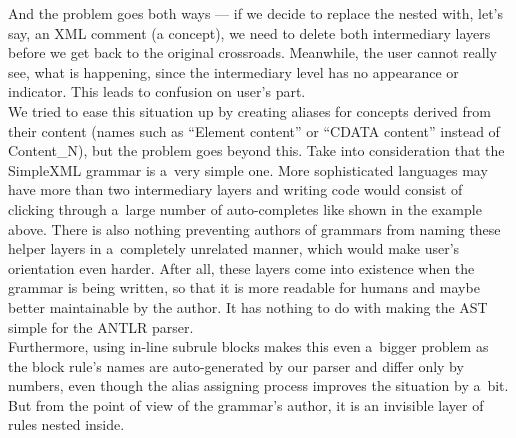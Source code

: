 And the problem goes both ways --- if we decide to replace the nested  with, let's say, an XML comment (a  concept), we need to delete both intermediary layers before we get back to the original  crossroads.
Meanwhile, the user cannot really see, what is happening, since the intermediary level has no appearance or indicator.
This leads to confusion on user's part.
\\

We tried to ease this situation up by creating aliases for concepts derived from their content (names such as “Element content” or “CDATA content” instead of Content{\_}N), but the problem goes beyond this.
Take into consideration that the SimpleXML grammar is a~very simple one.
More sophisticated languages may have more than two intermediary layers and writing code would consist of clicking through a~large number of auto-completes like shown in the example above.
There is also nothing preventing authors of grammars from naming these helper layers in a~completely unrelated manner, which would make user's orientation even harder.
After all, these layers come into existence when the grammar is being written, so that it is more readable for humans and maybe better maintainable by the author.
It has nothing to do with making the AST simple for the ANTLR parser.
\\

Furthermore, using in-line subrule blocks makes this even a~bigger problem as the block rule's names are auto-generated by our parser and differ only by numbers, even though the alias assigning process improves the situation by a~bit.
But from the point of view of the grammar's author, it is an invisible layer of rules nested inside.

